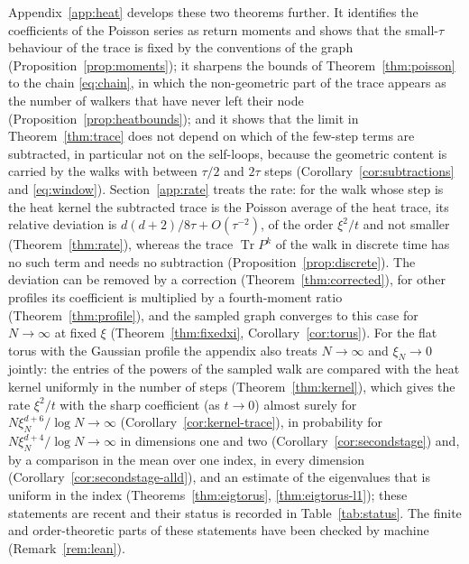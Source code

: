 \documentclass[11pt,a4paper]{article}
\theoremstyle{stmt}
\theoremstyle{defn}
\theoremstyle{rmk}
\numberwithin{equation}{section}
\DeclareMathOperator{\Tr}{Tr}
\begin{document}
Appendix~\ref{app:heat} develops these two theorems further. It identifies the coefficients of the Poisson series as return moments and shows that the small-$\tau$ behaviour of the trace is fixed by the conventions of the graph (Proposition~\ref{prop:moments}); it sharpens the bounds of Theorem~\ref{thm:poisson} to the chain \eqref{eq:chain}, in which the non-geometric part of the trace appears as the number of walkers that have never left their node (Proposition~\ref{prop:heatbounds}); and it shows that the limit in Theorem~\ref{thm:trace} does not depend on which of the few-step terms are subtracted, in particular not on the self-loops, because the geometric content is carried by the walks with between $\tau/2$ and $2\tau$ steps (Corollary~\ref{cor:subtractions} and \eqref{eq:window}). Section~\ref{app:rate} treats the rate: for the walk whose step is the heat kernel the subtracted trace is the Poisson average of the heat trace, its relative deviation is $d(d+2)/8\tau+O(\tau^{-2})$, of the order $\xi^2/t$ and not smaller (Theorem~\ref{thm:rate}), whereas the trace $\Tr P^k$ of the walk in discrete time has no such term and needs no subtraction (Proposition~\ref{prop:discrete}). The deviation can be removed by a correction (Theorem~\ref{thm:corrected}), for other profiles its coefficient is multiplied by a fourth-moment ratio (Theorem~\ref{thm:profile}), and the sampled graph converges to this case for $N\to\infty$ at fixed $\xi$ (Theorem~\ref{thm:fixedxi}, Corollary~\ref{cor:torus}). For the flat torus with the Gaussian profile the appendix also treats $N\to\infty$ and $\xi_N\to0$ jointly: the entries of the powers of the sampled walk are compared with the heat kernel uniformly in the number of steps (Theorem~\ref{thm:kernel}), which gives the rate $\xi^2/t$ with the sharp coefficient (as $t\to0$) almost surely for $N\xi_N^{d+6}/\log N\to\infty$ (Corollary~\ref{cor:kernel-trace}), in probability for $N\xi_N^{d+4}/\log N\to\infty$ in dimensions one and two (Corollary~\ref{cor:secondstage}) and, by a comparison in the mean over one index, in every dimension (Corollary~\ref{cor:secondstage-alld}), and an estimate of the eigenvalues that is uniform in the index (Theorems~\ref{thm:eigtorus}, \ref{thm:eigtorus-l1}); these statements are recent and their status is recorded in Table~\ref{tab:status}. The finite and order-theoretic parts of these statements have been checked by machine (Remark~\ref{rem:lean}).
\end{document}
